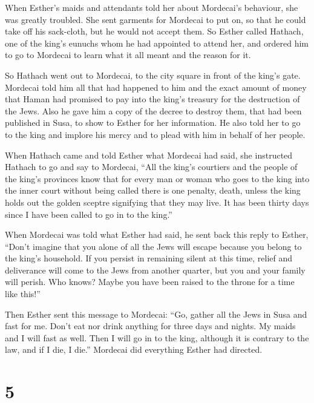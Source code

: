  When Esther's maids and attendants told her about
Mordecai's behaviour, she was greatly troubled. She sent garments for
Mordecai to put on, so that he could take off his sack-cloth, but he
would not accept them.  So Esther called Hathach, one of the
king's eunuchs whom he had appointed to attend her, and ordered him to
go to Mordecai to learn what it all meant and the reason for it.

 So Hathach went out to Mordecai, to the city square in
front of the king's gate.  Mordecai told him all that had
happened to him and the exact amount of money that Haman had promised to
pay into the king's treasury for the destruction of the Jews.
 Also he gave him a copy of the decree to destroy them, that
had been published in Susa, to show to Esther for her information. He
also told her to go to the king and implore his mercy and to plead with
him in behalf of her people.

 When Hathach came and told Esther what Mordecai had said,
 she instructed Hathach to go and say to Mordecai,
 ``All the king's courtiers and the people of the king's
provinces know that for every man or woman who goes to the king into the
inner court without being called there is one penalty, death, unless the
king holds out the golden sceptre signifying that they may live. It has
been thirty days since I have been called to go in to the king.''

 When Mordecai was told what Esther had said, 
he sent back this reply to Esther, ``Don't imagine that you alone of all
the Jews will escape because you belong to the king's household.
 If you persist in remaining silent at this time, relief
and deliverance will come to the Jews from another quarter, but you and
your family will perish. Who knows? Maybe you have been raised to the
throne for a time like this!''

 Then Esther sent this message to Mordecai: 
``Go, gather all the Jews in Susa and fast for me. Don't eat nor drink
anything for three days and nights. My maids and I will fast as well.
Then I will go in to the king, although it is contrary to the law, and
if I die, I die.''  Mordecai did everything Esther had
directed.

\hypertarget{section-4}{%
\section{5}\label{section-4}}


